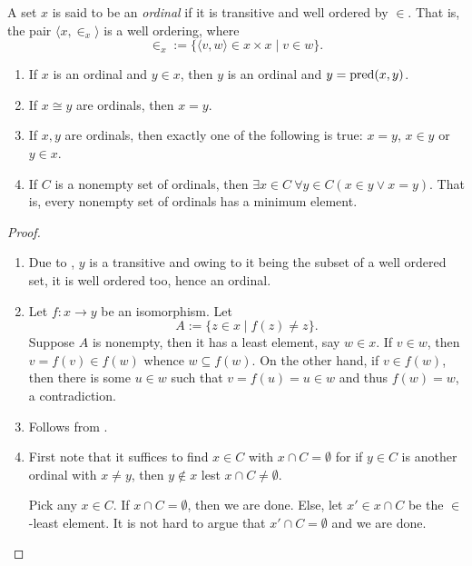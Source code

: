 \begin{definition}[Ordinal]
    A set $x$ is said to be an \emph{ordinal} if it is transitive and well ordered by $\in$. That is, the pair $\langle x,\in_x\rangle$ is a well ordering, where 
    \begin{equation*}
        \in_x := \{\langle v,w\rangle\in x\times x\mid v\in w\}.
    \end{equation*}
\end{definition}

\begin{theorem}\hfill
\begin{enumerate}[label=(\alph*)]
    \item If $x$ is an ordinal and $y\in x$, then $y$ is an ordinal and $y = \operatorname{pred}(x, y)$.
    \item If $x\cong y$ are ordinals, then $x = y$. 
    \item If $x,y$ are ordinals, then exactly one of the following is true: $x = y$, $x\in y$ or $y\in x$. 
    \item If $C$ is a nonempty set of ordinals, then $\exists x\in C~\forall y\in C(x\in y\vee x = y)$. That is, every nonempty set of ordinals has a minimum element.
\end{enumerate}
\end{theorem}
\begin{proof}
\begin{enumerate}[label=(\alph*)]
    \item Due to , $y$ is a transitive and owing to it being the subset of a well ordered set, it is well ordered too, hence an ordinal.

    \item Let $f: x\to y$ be an isomorphism. Let 
    \begin{equation*}
        A := \{z\in x\mid f(z)\ne z\}.
    \end{equation*}
    Suppose $A$ is nonempty, then it has a least element, say $w\in x$. If $v\in w$, then $v = f(v)\in f(w)$ whence $w\subseteq f(w)$. On the other hand, if $v\in f(w)$, then there is some $u\in w$ such that $v = f(u) = u\in w$ and thus $f(w) = w$, a contradiction. 

    \item Follows from .

    \item First note that it suffices to find $x\in C$ with $x\cap C = \emptyset$ for if $y\in C$ is another ordinal with $x\ne y$, then $y\notin x$ lest $x\cap C\ne\emptyset$.

    Pick any $x\in C$. If $x\cap C = \emptyset$, then we are done. Else, let $x'\in x\cap C$ be the $\in$-least element. It is not hard to argue that $x'\cap C = \emptyset$ and we are done.
\end{enumerate}
\end{proof}


